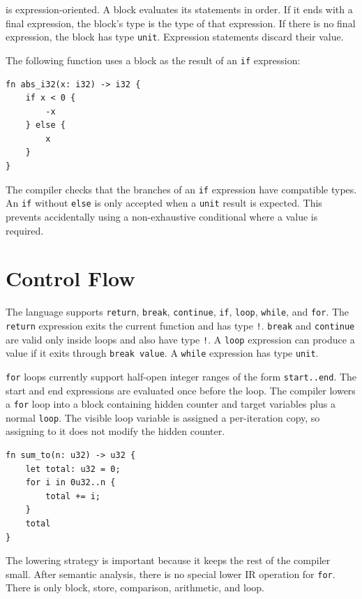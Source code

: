 \epl{} is expression-oriented. A block evaluates its statements in order. If it
ends with a final expression, the block's type is the type of that expression. If
there is no final expression, the block has type \texttt{unit}. Expression
statements discard their value.

The following function uses a block as the result of an \texttt{if} expression:

\begin{lstlisting}[language=EPL,caption={Expression-oriented conditional}]
fn abs_i32(x: i32) -> i32 {
	if x < 0 {
		-x
	} else {
		x
	}
}
\end{lstlisting}

The compiler checks that the branches of an \texttt{if} expression have
compatible types. An \texttt{if} without \texttt{else} is only accepted when a
\texttt{unit} result is expected. This prevents accidentally using a
non-exhaustive conditional where a value is required.

\section{Control Flow}

The language supports \texttt{return}, \texttt{break}, \texttt{continue},
\texttt{if}, \texttt{loop}, \texttt{while}, and \texttt{for}. The \texttt{return}
expression exits the current function and has type \texttt{!}. \texttt{break}
and \texttt{continue} are valid only inside loops and also have type
\texttt{!}. A \texttt{loop} expression can produce a value if it exits through
\texttt{break value}. A \texttt{while} expression has type \texttt{unit}.

\texttt{for} loops currently support half-open integer ranges of the form
\texttt{start..end}. The start and end expressions are evaluated once before the
loop. The compiler lowers a \texttt{for} loop into a block containing hidden
counter and target variables plus a normal \texttt{loop}. The visible loop
variable is assigned a per-iteration copy, so assigning to it does not modify the
hidden counter.

\begin{lstlisting}[language=EPL,caption={Loop forms used in EPL}]
fn sum_to(n: u32) -> u32 {
	let total: u32 = 0;
	for i in 0u32..n {
		total += i;
	}
	total
}
\end{lstlisting}

The lowering strategy is important because it keeps the rest of the compiler
small. After semantic analysis, there is no special lower IR operation for
\texttt{for}. There is only block, store, comparison, arithmetic, and loop.

